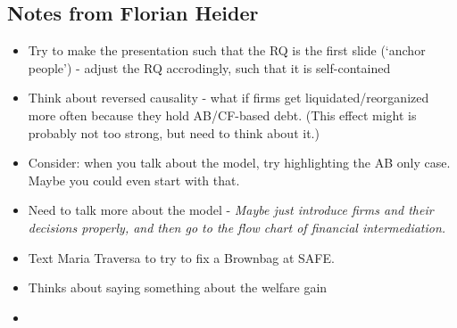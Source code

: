 \documentclass[12pt]{article}
\begin{document}
\subsection*{Notes from Florian Heider}
\begin{itemize} \setlength\itemsep{0em}  \small
    \item Try to make the presentation such that the RQ is the first slide (`anchor people') - adjust the RQ accrodingly, such that it is self-contained
    \item Think about reversed causality - what if firms get liquidated/reorganized more often because they hold AB/CF-based debt. (This effect might is probably not too strong, but need to think about it.) 
    \item Consider: when you talk about the model, try highlighting the AB only case. Maybe you could even start with that. 
    \item Need to talk more about the model - \textit{Maybe just introduce firms and their decisions properly, and then go to the flow chart of financial intermediation.}
    \item Text Maria Traversa to try to fix a Brownbag at SAFE. 
    \item Thinks about saying something about the welfare gain
    \item 
\end{itemize} \normalsize
\end{document}
